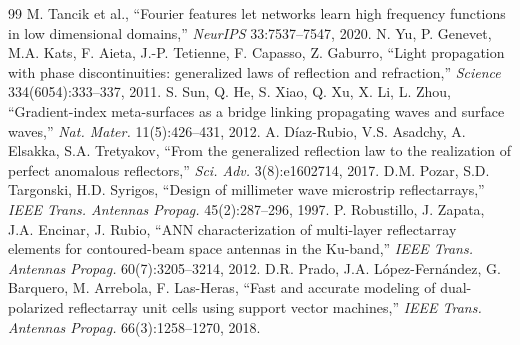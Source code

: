 \documentclass[11pt]{article}
\begin{document}
\begin{thebibliography}{99}
 M. Tancik et al., ``Fourier features let networks learn high frequency functions in low dimensional domains,'' \emph{NeurIPS} 33:7537--7547, 2020.
 N. Yu, P. Genevet, M.A. Kats, F. Aieta, J.-P. Tetienne, F. Capasso, Z. Gaburro, ``Light propagation with phase discontinuities: generalized laws of reflection and refraction,'' \emph{Science} 334(6054):333--337, 2011.
 S. Sun, Q. He, S. Xiao, Q. Xu, X. Li, L. Zhou, ``Gradient-index meta-surfaces as a bridge linking propagating waves and surface waves,'' \emph{Nat. Mater.} 11(5):426--431, 2012.
 A. D\'iaz-Rubio, V.S. Asadchy, A. Elsakka, S.A. Tretyakov, ``From the generalized reflection law to the realization of perfect anomalous reflectors,'' \emph{Sci. Adv.} 3(8):e1602714, 2017.
 D.M. Pozar, S.D. Targonski, H.D. Syrigos, ``Design of millimeter wave microstrip reflectarrays,'' \emph{IEEE Trans. Antennas Propag.} 45(2):287--296, 1997.
 P. Robustillo, J. Zapata, J.A. Encinar, J. Rubio, ``ANN characterization of multi-layer reflectarray elements for contoured-beam space antennas in the Ku-band,'' \emph{IEEE Trans. Antennas Propag.} 60(7):3205--3214, 2012.
 D.R. Prado, J.A. L\'opez-Fern\'andez, G. Barquero, M. Arrebola, F. Las-Heras, ``Fast and accurate modeling of dual-polarized reflectarray unit cells using support vector machines,'' \emph{IEEE Trans. Antennas Propag.} 66(3):1258--1270, 2018.
\end{thebibliography}
\end{document}
